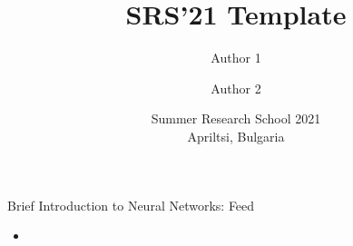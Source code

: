 \documentclass[pdf]{beamer}
\title[Short title]{SRS'21 Template}
\author[Short author]{Author 1 \and Author 2}
\date[SRS'21]{Summer Research School 2021\\Apriltsi, Bulgaria}
\begin{document}
\begin{frame}
\thispagestyle{empty}          %
\titlepage
\end{frame}
\addtocounter{framenumber}{-1} %

\begin{frame}{Brief Introduction to Neural Networks: Feed}
    \begin{itemize}
        \item 
    \end{itemize}
\end{frame}
\end{document}
